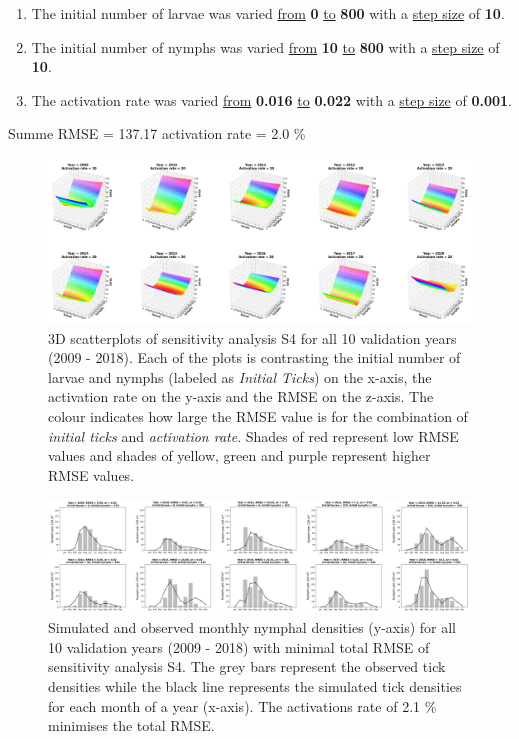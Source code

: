 \documentclass[a4paper, 11pt]{scrartcl}
\begin{document}
\begin{enumerate}
\item The initial number of larvae was varied \underline{from} \textbf{0} \underline{to} \textbf{800} with a \underline{step size} of \textbf{10}.
\item The initial number of nymphs was varied \underline{from} \textbf{10} \underline{to} \textbf{800} with a \underline{step size} of \textbf{10}.
\item The activation rate was varied \underline{from} \textbf{0.016} \underline{to} \textbf{0.022} with a \underline{step size} of \textbf{0.001}.
\end{enumerate}

Summe RMSE = 137.17
activation rate = 2.0 \%

\begin{figure}[h!]
\centering
\includegraphics[width=1.0\textwidth]{figures/independent_initial_ticks_without_beech_error}
\caption{3D scatterplots of sensitivity analysis S4 for all 10 validation years (2009 - 2018). Each of the plots is contrasting the initial number of larvae and nymphs
(labeled as \textit{Initial Ticks}) on the x-axis, the activation rate on the y-axis and the RMSE on the z-axis. The colour indicates how large the RMSE value is for the
combination of \textit{initial ticks} and \textit{activation rate}. Shades of red represent low RMSE values and shades of yellow, green and purple represent higher RMSE values.}
\label{fig:independent_initial_ticks_without_beech_error}
\end{figure}

\begin{figure}[h!]
\centering
\includegraphics[width=1.0\textwidth]{figures/independent_initial_ticks_without_beech}
\caption{Simulated and observed monthly nymphal densities (y-axis) for all 10 validation years (2009 - 2018) with minimal total RMSE of sensitivity analysis S4. The grey bars
represent the observed tick densities while the black line represents the simulated tick densities for each month of a year (x-axis). The activations rate of 2.1 \% minimises
the total RMSE.}
\label{fig:independent_initial_ticks_without_beech}
\end{figure}
\end{document}

